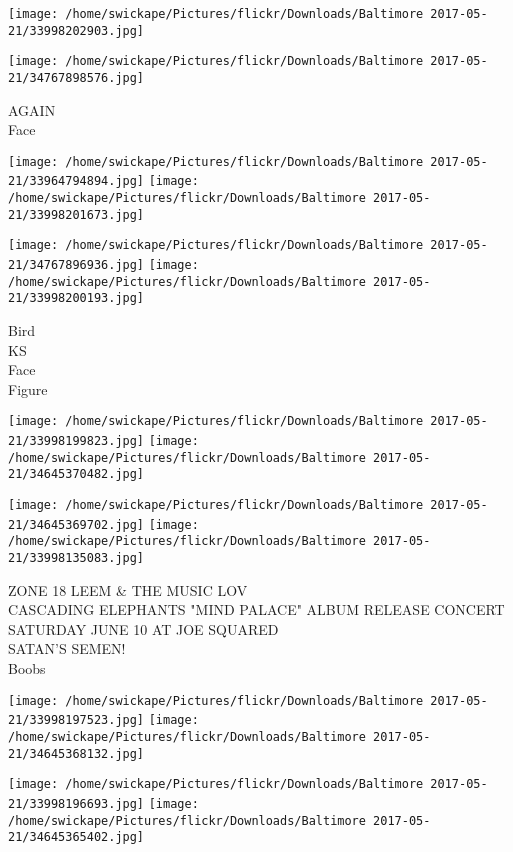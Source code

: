 \documentclass[10pt,letterpaper]{article}
\begin{document}
\texttt{[image: /home/swickape/Pictures/flickr/Downloads/Baltimore 2017-05-21/33998202903.jpg]}

\vspace{0.25in}
\texttt{[image: /home/swickape/Pictures/flickr/Downloads/Baltimore 2017-05-21/34767898576.jpg]}

AGAIN\\
Face\\
\pagebreak

\texttt{[image: /home/swickape/Pictures/flickr/Downloads/Baltimore 2017-05-21/33964794894.jpg]}
\texttt{[image: /home/swickape/Pictures/flickr/Downloads/Baltimore 2017-05-21/33998201673.jpg]}

\texttt{[image: /home/swickape/Pictures/flickr/Downloads/Baltimore 2017-05-21/34767896936.jpg]}
\texttt{[image: /home/swickape/Pictures/flickr/Downloads/Baltimore 2017-05-21/33998200193.jpg]}

Bird\\
KS\\
Face\\
Figure\\
\pagebreak

\texttt{[image: /home/swickape/Pictures/flickr/Downloads/Baltimore 2017-05-21/33998199823.jpg]}
\texttt{[image: /home/swickape/Pictures/flickr/Downloads/Baltimore 2017-05-21/34645370482.jpg]}

\texttt{[image: /home/swickape/Pictures/flickr/Downloads/Baltimore 2017-05-21/34645369702.jpg]}
\texttt{[image: /home/swickape/Pictures/flickr/Downloads/Baltimore 2017-05-21/33998135083.jpg]}

ZONE 18 LEEM \& THE MUSIC LOV\\
CASCADING ELEPHANTS "MIND PALACE" ALBUM RELEASE CONCERT SATURDAY JUNE 10 AT JOE SQUARED\\
SATAN'S SEMEN!\\
Boobs\\
\pagebreak

\texttt{[image: /home/swickape/Pictures/flickr/Downloads/Baltimore 2017-05-21/33998197523.jpg]}
\texttt{[image: /home/swickape/Pictures/flickr/Downloads/Baltimore 2017-05-21/34645368132.jpg]}

\texttt{[image: /home/swickape/Pictures/flickr/Downloads/Baltimore 2017-05-21/33998196693.jpg]}
\texttt{[image: /home/swickape/Pictures/flickr/Downloads/Baltimore 2017-05-21/34645365402.jpg]}
\end{document}
